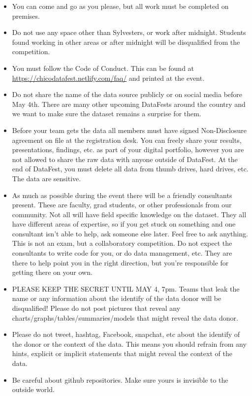 \documentclass[]{article}
\begin{document}
\begin{itemize}
\item
  You can come and go as you please, but all work must be completed on
  premises.
\item
  Do not use any space other than Sylvesters, or work after midnight.
  Students found working in other areas or after midnight will be
  disqualified from the competition.
\item
  You must follow the Code of Conduct. This can be found at
  \url{https://chicodatafest.netlify.com/faq/} and printed at the event.
\item
  Do not share the name of the data source publicly or on social media
  before May 4th. There are many other upcoming DataFests around the
  country and we want to make sure the dataset remains a surprise for
  them.
\item
  Before your team gets the data all members must have signed
  Non-Disclosure agreement on file at the registration desk. You can
  freely share your results, presentations, findings, etc. as part of
  your digital portfolio, however you are not allowed to share the raw
  data with anyone outside of DataFest. At the end of DataFest, you must
  delete all data from thumb drives, hard drives, etc. The data are
  sensitive.
\item
  As much as possible during the event there will be a friendly
  consultants present. These are faculty, grad students, or other
  professionals from our community. Not all will have field specific
  knowledge on the dataset. They all have different areas of expertise,
  so if you get stuck on something and one consultant isn't able to
  help, ask someone else later. Feel free to ask anything. This is not
  an exam, but a collaboratory competition. Do not expect the
  consultants to write code for you, or do data management, etc. They
  are there to help point you in the right direction, but you're
  responsible for getting there on your own.
\item
  PLEASE KEEP THE SECRET UNTIL MAY 4, 7pm. Teams that leak the name or
  any information about the identify of the data donor will be
  disqualified! Please do not post pictures that reveal any
  charts/graphs/tables/summaries/models that might reveal the data
  donor.
\item
  Please do not tweet, hashtag, Facebook, snapchat, etc about the
  identify of the donor or the context of the data. This means you
  should refrain from any hints, explicit or implicit statements that
  might reveal the context of the data.
\item
  Be careful about github repositories. Make sure yours is invisible to
  the outside world.
\end{itemize}
\end{document}
